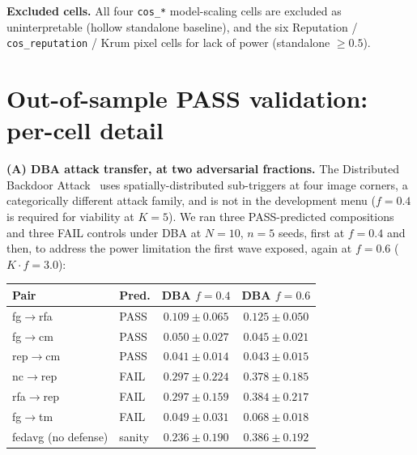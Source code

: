 \documentclass{article}
\begin{document}
\textbf{Excluded cells.} All four \texttt{cos\_*} model-scaling cells are excluded as uninterpretable (hollow standalone baseline), and the six Reputation / \texttt{cos\_reputation} / Krum pixel cells for lack of power (standalone $\ge 0.5$).

\section{Out-of-sample PASS validation: per-cell detail}
\label{app:oos_detail}

\textbf{(A) DBA attack transfer, at two adversarial fractions.} The Distributed Backdoor
Attack~\citep{xie2019dba} uses spatially-distributed sub-triggers at four image corners, a
categorically different attack family, and is not in the development menu ($f{=}0.4$ is required for
viability at $K{=}5$). We ran three PASS-predicted compositions and three FAIL controls under DBA at
$N{=}10$, $n{=}5$ seeds, first at $f{=}0.4$ and then, to address the power limitation the first wave
exposed, again at $f{=}0.6$ ($K{\cdot}f{=}3.0$):

\begin{center}\small
\begin{tabular}{llcc}
\toprule
\textbf{Pair} & \textbf{Pred.} & \textbf{DBA $f{=}0.4$} & \textbf{DBA $f{=}0.6$} \\
\midrule
fg$\to$rfa & PASS & $0.109 \pm 0.065$ & $0.125 \pm 0.050$ \\
fg$\to$cm & PASS & $0.050 \pm 0.027$ & $0.045 \pm 0.021$ \\
rep$\to$cm & PASS & $0.041 \pm 0.014$ & $0.043 \pm 0.015$ \\
\midrule
nc$\to$rep & FAIL & $0.297 \pm 0.224$ & $0.378 \pm 0.185$ \\
rfa$\to$rep & FAIL & $0.297 \pm 0.159$ & $0.384 \pm 0.217$ \\
fg$\to$tm & FAIL & $0.049 \pm 0.031$ & $0.068 \pm 0.018$ \\
\midrule
fedavg (no defense) & sanity & $0.236 \pm 0.190$ & $0.386 \pm 0.192$ \\
\bottomrule
\end{tabular}
\end{center}
\end{document}
